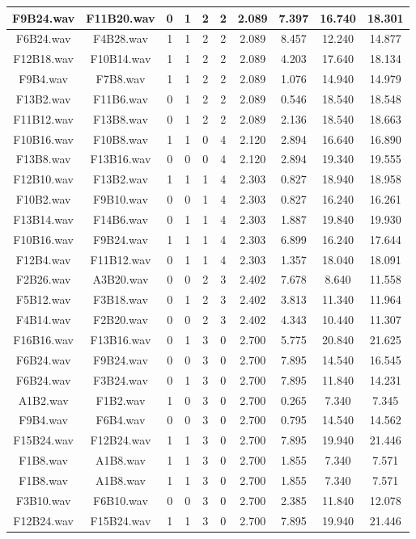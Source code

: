 \documentclass[11pt,a4paper]{book}
\begin{document}
\begin{longtable}[c]{|c|c|c|c|c|c|c|c|c|c|}
F9B24.wav&F11B20.wav&0&1&2&2&2.089&7.397&16.740&18.301\\ \hline
F6B24.wav&F4B28.wav&1&1&2&2&2.089&8.457&12.240&14.877\\ \hline
F12B18.wav&F10B14.wav&1&1&2&2&2.089&4.203&17.640&18.134\\ \hline
F9B4.wav&F7B8.wav&1&1&2&2&2.089&1.076&14.940&14.979\\ \hline
F13B2.wav&F11B6.wav&0&1&2&2&2.089&0.546&18.540&18.548\\ \hline
F11B12.wav&F13B8.wav&0&1&2&2&2.089&2.136&18.540&18.663\\ \hline
F10B16.wav&F10B8.wav&1&1&0&4&2.120&2.894&16.640&16.890\\ \hline
F13B8.wav&F13B16.wav&0&0&0&4&2.120&2.894&19.340&19.555\\ \hline
F12B10.wav&F13B2.wav&1&1&1&4&2.303&0.827&18.940&18.958\\ \hline
F10B2.wav&F9B10.wav&0&0&1&4&2.303&0.827&16.240&16.261\\ \hline
F13B14.wav&F14B6.wav&0&1&1&4&2.303&1.887&19.840&19.930\\ \hline
F10B16.wav&F9B24.wav&1&1&1&4&2.303&6.899&16.240&17.644\\ \hline
F12B4.wav&F11B12.wav&0&1&1&4&2.303&1.357&18.040&18.091\\ \hline
F2B26.wav&A3B20.wav&0&0&2&3&2.402&7.678&8.640&11.558\\ \hline
F5B12.wav&F3B18.wav&0&1&2&3&2.402&3.813&11.340&11.964\\ \hline
F4B14.wav&F2B20.wav&0&0&2&3&2.402&4.343&10.440&11.307\\ \hline
F16B16.wav&F13B16.wav&0&1&3&0&2.700&5.775&20.840&21.625\\ \hline
F6B24.wav&F9B24.wav&0&0&3&0&2.700&7.895&14.540&16.545\\ \hline
F6B24.wav&F3B24.wav&0&1&3&0&2.700&7.895&11.840&14.231\\ \hline
A1B2.wav&F1B2.wav&1&0&3&0&2.700&0.265&7.340&7.345\\ \hline
F9B4.wav&F6B4.wav&0&0&3&0&2.700&0.795&14.540&14.562\\ \hline
F15B24.wav&F12B24.wav&1&1&3&0&2.700&7.895&19.940&21.446\\ \hline
F1B8.wav&A1B8.wav&1&1&3&0&2.700&1.855&7.340&7.571\\ \hline
F1B8.wav&A1B8.wav&1&1&3&0&2.700&1.855&7.340&7.571\\ \hline
F3B10.wav&F6B10.wav&0&0&3&0&2.700&2.385&11.840&12.078\\ \hline
F12B24.wav&F15B24.wav&1&1&3&0&2.700&7.895&19.940&21.446\\ \hline

\end{longtable}
\end{document}
